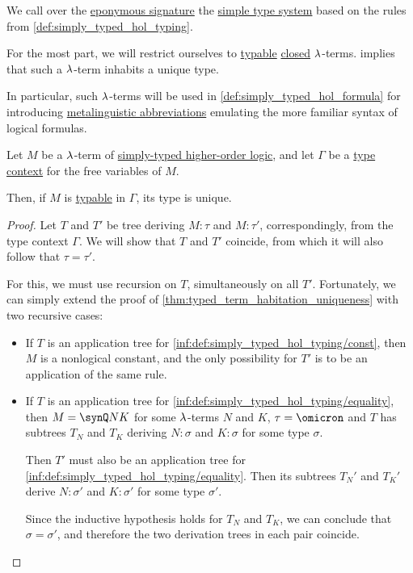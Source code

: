 \begin{definition}\label{def:simply_typed_hol}
  We call  over the \hyperref[def:simply_typed_hol_signature]{eponymous signature} the \hyperref[def:simple_type_system]{simple type system} based on the rules from \cref{def:simply_typed_hol_typing}.

  For the most part, we will restrict ourselves to \hyperref[def:typability]{typable} \hyperref[def:lambda_combinator]{closed} \( {\mathrm \lambda} \)-terms.  implies that such a \( {\mathrm \lambda} \)-term inhabits a unique type.

  In particular, such \( {\mathrm \lambda} \)-terms will be used in \cref{def:simply_typed_hol_formula} for introducing \hyperref[con:metalingual_abbreviation]{metalinguistic abbreviations} emulating the more familiar syntax of logical formulas.
\end{definition}

\begin{proposition}\label{thm:simply_typed_hol_type_uniqueness}
  Let \( M \) be a \( {\mathrm \lambda} \)-term of \hyperref[def:simply_typed_hol]{simply-typed higher-order logic}, and let \( \Gamma \) be a \hyperref[def:type_context]{type context} for the free variables of \( M \).

  Then, if \( M \) is \hyperref[def:typability]{typable} in \( \Gamma \), its type is unique.
\end{proposition}
\begin{proof}
  Let \( T \) and \( T' \) be tree deriving \( M: \tau \) and \( M: \tau' \), correspondingly, from the type context \( \Gamma \). We will show that \( T \) and \( T' \) coincide, from which it will also follow that \( \tau = \tau' \).

  For this, we must use recursion on \( T \), simultaneously on all \( T' \). Fortunately, we can simply extend the proof of \cref{thm:typed_term_habitation_uniqueness} with two recursive cases:
  \begin{itemize}
    \item If \( T \) is an application tree for \ref{inf:def:simply_typed_hol_typing/const}, then \( M \) is a nonlogical constant, and the only possibility for \( T' \) is to be an application of the same rule.

    \item If \( T \) is an application tree for \ref{inf:def:simply_typed_hol_typing/equality}, then \( M = \synQ N K \) for some \( {\mathrm \lambda} \)-terms \( N \) and \( K \), \( \tau = \omicron \) and \( T \) has subtrees \( T_N \) and \( T_K \) deriving \( N: \sigma \) and \( K: \sigma \) for some type \( \sigma \).

    Then \( T' \) must also be an application tree for \ref{inf:def:simply_typed_hol_typing/equality}. Then its subtrees \( T_N' \) and \( T_K' \) derive \( N: \sigma' \) and \( K: \sigma' \) for some type \( \sigma' \).

    Since the inductive hypothesis holds for \( T_N \) and \( T_K \), we can conclude that \( \sigma = \sigma' \), and therefore the two derivation trees in each pair coincide.
  \end{itemize}
\end{proof}

